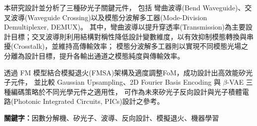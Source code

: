 本研究設計並分析了三種矽光子關鍵元件，
包括 彎曲波導(Bend Waveguide)、交叉波導(Waveguide Crossing)以及模態分波解多工器(Mode-Division Demultiplexer, DEMUX)。
其中，彎曲波導以提升穿透率(Transmission)為主要設計目標；交叉波導則利用結構對稱性降低設計變數維度，以有效抑制模態轉換與串擾(Crosstalk)，並維持高傳輸效率；
模態分波解多工器則以實現不同模態光場之分離為設計目標，提升各輸出通道之模態純度與傳輸效率。

透過 FM 模型結合模擬退火(FMSA)架構及適度調整FoM，成功設計出高效能矽光子元件，
並比較 Gaussian Upsampling、2D Fourier Basis Encoding 與 $\beta$-VAE 三種編碼策略於不同光學元件之適用性，
可作為未來矽光子反向設計與光子積體電路(Photonic Integrated Circuits, PICs)設計之參考。
\vspace{1cm}

\textbf{關鍵字：}因數分解機、矽光子、波導、反向設計、模擬退火、機器學習
